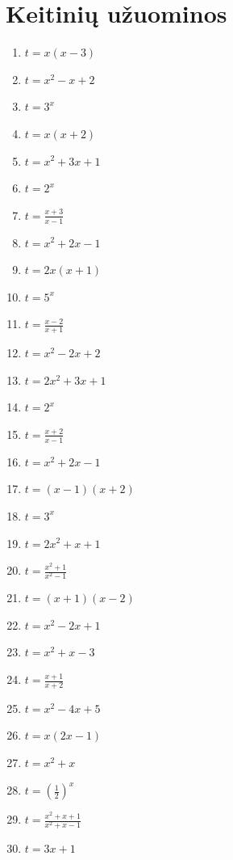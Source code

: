 \documentclass[11pt,a4paper]{article}
\begin{document}
\section*{Keitinių užuominos}
\begin{enumerate}
\item \(\displaystyle t=x(x-3)\)
\item \(\displaystyle t=x^2-x+2\)
\item \(\displaystyle t=3^x\)
\item \(\displaystyle t=x(x+2)\)
\item \(\displaystyle t=x^2+3x+1\)
\item \(\displaystyle t=2^x\)
\item \(\displaystyle t=\frac{x+3}{x-1}\)
\item \(\displaystyle t=x^2+2x-1\)
\item \(\displaystyle t=2x(x+1)\)
\item \(\displaystyle t=5^x\)
\item \(\displaystyle t=\frac{x-2}{x+1}\)
\item \(\displaystyle t=x^2-2x+2\)
\item \(\displaystyle t=2x^2+3x+1\)
\item \(\displaystyle t=2^x\)
\item \(\displaystyle t=\frac{x+2}{x-1}\)
\item \(\displaystyle t=x^2+2x-1\)
\item \(\displaystyle t=(x-1)(x+2)\)
\item \(\displaystyle t=3^x\)
\item \(\displaystyle t=2x^2+x+1\)
\item \(\displaystyle t=\frac{x^2+1}{x^2-1}\)
\item \(\displaystyle t=(x+1)(x-2)\)
\item \(\displaystyle t=x^2-2x+1\)
\item \(\displaystyle t=x^2+x-3\)
\item \(\displaystyle t=\frac{x+1}{x+2}\)
\item \(\displaystyle t=x^2-4x+5\)
\item \(\displaystyle t=x(2x-1)\)
\item \(\displaystyle t=x^2+x\)
\item \(\displaystyle t=\left(\frac12\right)^x\)
\item \(\displaystyle t=\frac{x^2+x+1}{x^2+x-1}\)
\item \(\displaystyle t=3x+1\)
\end{enumerate}
\end{document}
